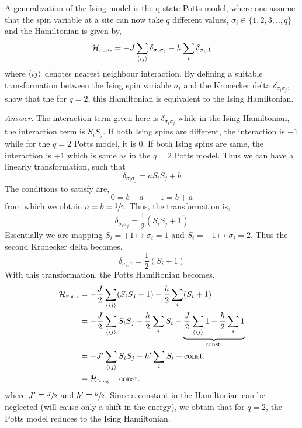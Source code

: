 \begin{question}
A generalization of the Ising model is the q-state Potts model, where one assume that the spin variable at a site can now take $q$ different values, $\sigma_i \in \{1, 2, 3, .., q\}$ and the Hamiltonian is given by,
$$\mathcal H_{\text{\tiny Potts}} = -J \sum\limits_{\left\langle ij \right\rangle}\delta_{\sigma_i \sigma_j} - h\sum\limits_i \delta_{\sigma_i,1}$$
where $\left\langle ij \right\rangle$ denotes nearest neighbour interaction. By defining a suitable transformation between
the Ising spin variable $\sigma_i$ and the Kronecker delta $\delta_{\sigma_i\sigma_j}$, show that the for $q=2$, this Hamiltonian is equivalent to the Ising Hamiltonian.
\end{question}
\noindent
\textit{Answer.} The interaction term given here is $\delta_{\sigma_i\sigma_j}$ while in the Ising Hamiltonian, the interaction term is $S_iS_j$. If both Ising spins are different, the interaction is $-1$ while for the $q=2$ Potts model, it is $0$. If both Ising spins are same, the interaction is $+1$ which is same as in the $q=2$ Potts model. Thus we can have a linearly transformation, such that 
$$\delta_{\sigma_i \sigma_j} = a S_iS_j + b$$
The conditions to satisfy are,
$$0 = b-a\qquad 1 = b+a$$
from which we obtain $a=b=\sfrac{1}{2}$. Thus, the transformation is, 
$$\delta_{\sigma_i \sigma_j} =  \frac{1}{2}(S_iS_j + 1)$$
Essentially we are mapping $S_i = +1 \mapsto \sigma_i = 1$ and $S_i = -1 \mapsto \sigma_i = 2$. Thus the second Kronecker delta becomes, 
$$\delta_{\sigma_i,1} = \frac{1}{2}(S_i +1)$$
With this transformation, the Potts Hamiltonian becomes, 
\begin{align}
   \begin{split}
     \mathcal H_{\text{\tiny Potts}} &= -\frac{J}{2} \sum\limits_{\left\langle ij \right\rangle} (S_iS_j+1) - \frac{h}{2}\sum\limits_i (S_i +1)\\
    &= -\frac{J}{2} \sum\limits_{\left\langle ij \right\rangle} S_iS_j - \frac{h}{2}\sum\limits_i S_i -\underbrace{\frac{J}{2}\sum\limits_{\left\langle ij \right\rangle}1 - \frac{h}{2}\sum\limits_{i} 1}_{\mathrm{const.}}\\
    &=-J'\sum\limits_{\left\langle ij \right\rangle} S_iS_j - h'\sum\limits_i S_i +\mathrm{const.}\\
    &=\mathcal H_{\text{\tiny Ising}}+\mathrm{const.}
   \end{split}
\end{align}
where $J'\equiv \sfrac{J}{2}$ and $h'\equiv \sfrac{h}{2}$. Since a constant in the Hamiltonian can be neglected (will cause only a shift in the energy), we obtain that for $q=2$, the Potts model reduces to the Ising Hamiltonian.